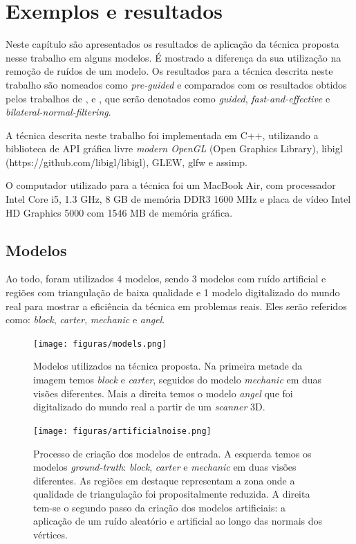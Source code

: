 \chapter{Exemplos e resultados}
\label{chap:exemploseresultados}

Neste capítulo são apresentados os resultados de aplicação da técnica proposta nesse trabalho em alguns modelos. É mostrado a diferença da sua utilização na remoção de ruídos de um modelo. Os resultados para a técnica descrita neste trabalho são nomeados como \textit{pre-guided} e comparados com os resultados obtidos pelos trabalhos de \cite{zhang2015guided}, \cite{sun2007fast} e \cite{zheng2011bilateral}, que serão denotados como \textit{guided}, \textit{fast-and-effective} e \textit{bilateral-normal-filtering}.

A técnica descrita neste trabalho foi implementada em C++, utilizando a biblioteca de API gráfica livre \textit{modern OpenGL} (Open Graphics Library), libigl (https://github.com/libigl/libigl), GLEW, glfw e assimp.

O computador utilizado para a técnica foi um MacBook Air, com processador Intel Core i5, 1.3 GHz, 8 GB de memória DDR3 1600 MHz e placa de vídeo Intel HD Graphics 5000 com 1546 MB de memória gráfica.

\section{Modelos}

Ao todo, foram utilizados 4 modelos, sendo 3 modelos com ruído artificial e regiões com triangulação de baixa qualidade e 1 modelo digitalizado do mundo real para mostrar a eficiência da técnica em problemas reais. Eles serão referidos como: \textit{block}, \textit{carter}, \textit{mechanic} e \textit{angel}. 

\begin{figure}[!h]
\captionsetup{width=\linewidth}
\centering
\texttt{[image: figuras/models.png]}
\caption{Modelos utilizados na técnica proposta. Na primeira metade da imagem temos \textit{block} e \textit{carter}, seguidos do modelo \textit{mechanic} em duas visões diferentes. Mais a direita temos o modelo \textit{angel} que foi digitalizado do mundo real a partir de um \textit{scanner} 3D.}
\label{fig:models}
\end{figure}

\begin{figure}[!h]
\captionsetup{width=\linewidth}
\centering 
\texttt{[image: figuras/artificialnoise.png]}
\caption{Processo de criação dos modelos de entrada. A esquerda temos os modelos \textit{ground-truth}: \textit{block}, \textit{carter} e \textit{mechanic} em duas visões diferentes. As regiões em destaque representam a zona onde a qualidade de triangulação foi propositalmente reduzida. A direita tem-se o segundo passo da criação dos modelos artificiais: a aplicação de um ruído aleatório e artificial ao longo das normais dos vértices.}
\label{fig:artificialnoise}
\end{figure}

